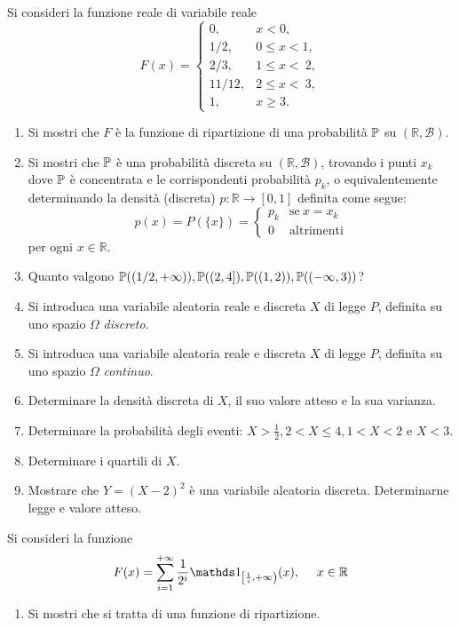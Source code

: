 Si consideri la funzione reale di variabile reale
\begin{equation*}
F( x) =
\begin{cases}
0, & x< 0,\\
1/2, & 0\leq x< 1,\\
2/3, & 1\leq x< \ 2,\\
11/12, & 2\leq x< \ 3,\\
1, & x\geq 3.
\end{cases}
\end{equation*}
\begin{enumerate}
\item Si mostri che $F$ è la funzione di ripartizione di una probabilità $\mathbb{P}$ su $(\mathbb{R} ,\mathcal{B})$.
\item Si mostri che $\mathbb{P}$ è una probabilità discreta su $(\mathbb{R} ,\mathcal{B})$, trovando i punti $x_{k}$ dove $\mathbb{P}$ è concentrata e le corrispondenti probabilità $p_{k}$, o equivalentemente determinando la densità (discreta) $p:\mathbb{R}\rightarrow [ 0,1]$ definita come segue:
\begin{equation*}
p( x) =P(\{x\}) =
\begin{cases}
p_{k} & \text{se} \ x=x_{k}\\
0 & \text{altrimenti}
\end{cases}
\end{equation*}
per ogni $x\in \mathbb{R}$.
\item Quanto valgono $\mathbb{P}(( 1/2,+\infty )) ,\mathbb{P}(( 2,4]) ,\mathbb{P}(( 1,2)) ,\mathbb{P}(( -\infty ,3))$?
\item Si introduca una variabile aleatoria reale e discreta $X$ di legge $P$, definita su uno spazio $\Omega $ \textit{discreto}.
\item Si introduca una variabile aleatoria reale e discreta $X$ di legge $P$, definita su uno spazio $\Omega $ \textit{continuo}.
\item Determinare la densità discreta di $X$, il suo valore atteso e la sua varianza.
\item Determinare la probabilità degli eventi: $X >\frac{1}{2} ,2< X\leq 4,1< X< 2$ e $X< 3$.
\item Determinare i quartili di $X$.
\item Mostrare che $Y=( X-2)^{2}$ è una variabile aleatoria discreta. Determinarne legge e valore atteso.
\end{enumerate}

\Esercizio{}

Si consideri la funzione
\begin{equation*}
F( x) =\sum\limits _{i=1}^{+\infty }\frac{1}{2^{i}}\Ind_{\left[\frac{1}{i} ,+\infty \right)}( x) ,\ \ \ \ x\in \mathbb{R}
\end{equation*}
\begin{enumerate}
\item Si mostri che si tratta di una funzione di ripartizione.
\end{enumerate}

